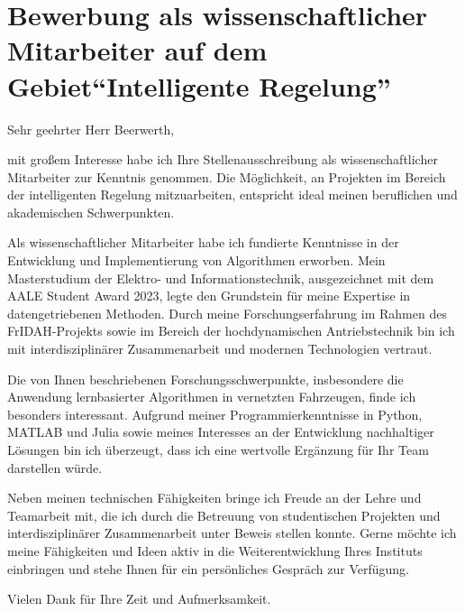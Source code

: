 \setlength{\parskip}{1em}

\section*{Bewerbung als wissenschaftlicher Mitarbeiter auf dem Gebiet\newline \enquote{Intelligente Regelung}}

Sehr geehrter Herr Beerwerth,

\vspace{2em}
mit großem Interesse habe ich Ihre Stellenausschreibung als wissenschaftlicher Mitarbeiter zur Kenntnis genommen. Die Möglichkeit, an Projekten im Bereich der intelligenten Regelung mitzuarbeiten, entspricht ideal meinen beruflichen und akademischen Schwerpunkten.

Als wissenschaftlicher Mitarbeiter habe ich fundierte Kenntnisse in der Entwicklung und Implementierung von Algorithmen erworben. Mein Masterstudium der Elektro- und Informationstechnik, ausgezeichnet mit dem AALE Student Award 2023, legte den Grundstein für meine Expertise in datengetriebenen Methoden. Durch meine Forschungserfahrung im Rahmen des FrIDAH-Projekts sowie im Bereich der hochdynamischen Antriebstechnik bin ich mit interdisziplinärer Zusammenarbeit und modernen Technologien vertraut.

Die von Ihnen beschriebenen Forschungsschwerpunkte, insbesondere die Anwendung lernbasierter Algorithmen in vernetzten Fahrzeugen, finde ich besonders interessant. Aufgrund meiner Programmierkenntnisse in Python, MATLAB und Julia sowie meines Interesses an der Entwicklung nachhaltiger Lösungen bin ich überzeugt, dass ich eine wertvolle Ergänzung für Ihr Team darstellen würde.

Neben meinen technischen Fähigkeiten bringe ich Freude an der Lehre und Teamarbeit mit, die ich durch die Betreuung von studentischen Projekten und interdisziplinärer Zusammenarbeit unter Beweis stellen konnte. Gerne möchte ich meine Fähigkeiten und Ideen aktiv in die Weiterentwicklung Ihres Instituts einbringen und stehe Ihnen für ein persönliches Gespräch zur Verfügung.

\vspace{2em}
Vielen Dank für Ihre Zeit und Aufmerksamkeit.